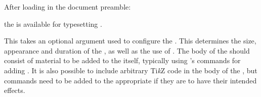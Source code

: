 \documentclass[10pt,british,a4paper]{ltxdoc}
\newcommand*\pkg[1]{\textpkg{#1}}
\newcommand*\TikZ{Ti\emph{k}Z}
\begin{document}
After loading  in the document preamble:
\begin{chronoscode}[chronos]
\usepackage{chronos}
\end{chronoscode}
the  \envlabelname{} is available for typesetting .
\begin{chronoscode}[chronos]
\begin{chronos}
  []
\end{chronos}
\end{chronoscode}
This takes an optional argument used to configure the .
This determines the size, appearance and duration of the , as well as the use of .
The body of the \envlabelname{} should consist of material to be added to the  itself, typically using \pkg{chronos}'s commands for adding .
It is also possible to include arbitrary \TikZ{} code in the body of the \envlabelname{}, but commands need to be added to the appropriate \pkg{chronos}  if they are to have their intended effects.
\end{document}
